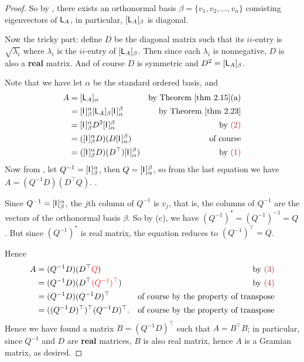 \begin{proof}
So by , there exists an orthonormal basis \(\beta = \{ v_1, v_2, ..., v_n \}\) consisting eigenvectors of \(\textsf{L}_A\), in particular, \([\textsf{L}_A]_{\beta}\) is diagonal.

Now the tricky part: define \(D\) be the diagonal matrix such that its \(ii\)-entry is \(\sqrt{\lambda_i}\) where \(\lambda_i\) is the \(ii\)-entry of \([\textsf{L}_A]_{\beta}\).
Then since each \(\lambda_i\) is nonnegative, \(D\) is also a \textbf{real} matrix.
And of course \(D\) is symmetric  and \(D^2 = [\textsf{L}_A]_{\beta}\). 

Note that we have let \(\alpha\) be the standard ordered basis, and
\begin{align*}
    A & = [\LMTRAN_A]_{\alpha} & \text{by \THM{2.15}(a)} \\
      & = [\ITRAN{}]_{\beta}^{\alpha} [\LMTRAN_A]_{\beta} [\ITRAN{}]_{\alpha}^{\beta} & \text{by \THM{2.23}} \\
      & = [\ITRAN{}]_{\beta}^{\alpha} D^2 [\ITRAN{}]_{\alpha}^{\beta} & \text{by \MAROON{(2)}} \\
      & = ([\ITRAN{}]_{\beta}^{\alpha} D) (D [\ITRAN{}]_{\alpha}^{\beta}) & \text{of course} \\
      & = ([\ITRAN{}]_{\beta}^{\alpha} D) (D^\top) [\ITRAN{}]_{\alpha}^{\beta}) & \text{by \MAROON{(1)}}
\end{align*}
Now from , let \(Q^{-1} = [\textsf{I}_{_{}}]_{\beta}^{\alpha}\), then \(Q = [\textsf{I}_{_{}}]_{\alpha}^{\beta}\), so from the last equation we have \(A = (Q^{-1} D) (D^\top Q)\). .

Since \(Q^{-1} = [\textsf{I}_{_{}}]_{\beta}^{\alpha}\), the \(j\)th column of \(Q^{-1}\) is \(v_j\), that is, the columns of \(Q^{-1}\) are the vectors of the orthonormal basis \(\beta\).
So by (c), we have \((Q^{-1})^* = (Q^{-1})^{-1} = Q\).
But since \((Q^{-1})^*\) is real matrix, the equation reduces to \((Q^{-1})^\top = Q\). 

Hence
\begin{align*}
    A & = (Q^{-1} D) (D^\top \RED{Q}) & \text{by \MAROON{(3)}} \\
      & = (Q^{-1} D) (D^\top \RED{(Q^{-1})^\top}) & \text{by \MAROON{(4)}} \\
      & = (Q^{-1} D) (Q^{-1} D)^\top & \text{of course by the property of transpose} \\
      & = ((Q^{-1} D)^\top)^\top (Q^{-1} D)^\top. & \text{of course by the property of transpose}
\end{align*}
Hence we have found a matrix \(B = (Q^{-1} D)^\top\) such that \(A = B^\top B\);
in particular, since \(Q^{-1}\) and \(D\) are \textbf{real} matrices, \(B\) is also real matrix, hence \(A\) is a Gramian matrix, as desired.
\end{proof}

